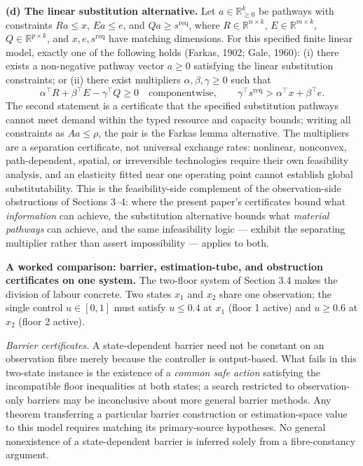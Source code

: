 \documentclass[11pt]{article}
\theoremstyle{definition}
\begin{document}
\textbf{(d) The linear substitution alternative.} Let \(a\in\mathbb R^k_{\ge0}\) be pathways with constraints \(Ra\le x\), \(Ea\le e\), and \(Qa\ge s^{\mathrm{req}}\), where \(R\in\mathbb R^{n\times k}\), \(E\in\mathbb R^{m\times k}\), \(Q\in\mathbb R^{p\times k}\), and \(x,e,s^{\mathrm{req}}\) have matching dimensions. For this specified finite linear model, exactly one of the following holds
(Farkas, 1902; Gale, 1960): (i) there exists a non-negative pathway
vector \(a \ge 0\) satisfying the linear substitution constraints; or
(ii) there exist multipliers \(\alpha, \beta, \gamma \ge 0\) such that
\[\alpha^\top R + \beta^\top E - \gamma^\top Q \ge 0 \quad\text{componentwise},\qquad \gamma^\top s^{\mathrm{req}} > \alpha^\top x + \beta^\top e.\]
The second statement is a certificate that the specified substitution pathways cannot meet demand within the typed resource and capacity
bounds; writing all constraints as \(Aa \le \rho\), the pair is the Farkas lemma alternative. The multipliers are a separation
certificate, not universal exchange rates: nonlinear, nonconvex,
path-dependent, spatial, or irreversible technologies require their own
feasibility analysis, and an elasticity fitted near one operating point
cannot establish global substitutability. This is the feasibility-side
complement of the observation-side obstructions of Sections 3--4: where
the present paper's certificates bound what \emph{information} can
achieve, the substitution alternative bounds what \emph{material
pathways} can achieve, and the same infeasibility logic --- exhibit the separating multiplier rather than assert impossibility --- applies to both.

\textbf{A worked comparison: barrier, estimation-tube, and obstruction certificates on one system.} The two-floor system of Section 3.4 makes the division of labour concrete. Two states \(x_1\) and \(x_2\) share one observation; the single control \(u\in[0,1]\) must satisfy \(u\le 0.4\) at \(x_1\) (floor 1 active) and \(u\ge 0.6\) at \(x_2\) (floor 2 active).

\emph{Barrier certificates.} A state-dependent barrier need not be constant on an observation fibre merely because the controller is output-based. What fails in this two-state instance is the existence of a \emph{common safe action} satisfying the incompatible floor inequalities at both states; a search restricted to observation-only barriers may be inconclusive about more general barrier methods. Any theorem transferring a particular barrier construction or estimation-space value to this model requires matching its primary-source hypotheses. No general nonexistence of a state-dependent barrier is inferred solely from a fibre-constancy argument.
\end{document}
